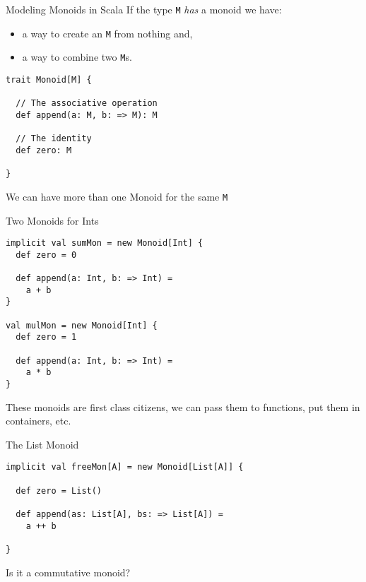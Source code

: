 \documentclass{beamer}
\begin{document}
\begin{framej}
\begin{frame}[fragile]{Modeling Monoids in Scala}
  If the type \texttt{M} \emph{has} a monoid we have:
  \begin{itemize}
    \item a way to create an \texttt{M} from nothing and,
    \item a way to combine two \texttt{M}s.
  \end{itemize}

  \begin{block}{}
  \begin{lstlisting}
trait Monoid[M] {

  // The associative operation
  def append(a: M, b: => M): M

  // The identity
  def zero: M

}
  \end{lstlisting}
  \end{block}

  We can have more than one Monoid for the same \texttt{M}
\end{frame}

\begin{frame}[fragile]{Two Monoids for Ints}
  \begin{block}{}
  \begin{lstlisting}
implicit val sumMon = new Monoid[Int] {
  def zero = 0

  def append(a: Int, b: => Int) =
    a + b
}

val mulMon = new Monoid[Int] {
  def zero = 1

  def append(a: Int, b: => Int) =
    a * b
}
  \end{lstlisting}
  \end{block}
  These monoids are first class citizens, we can pass them to
  functions, put them in containers, etc.
\end{frame}

\begin{frame}[fragile]{The List Monoid}
  \begin{block}{}

  \begin{lstlisting}
implicit val freeMon[A] = new Monoid[List[A]] {

  def zero = List()

  def append(as: List[A], bs: => List[A]) =
    a ++ b

}
  \end{lstlisting}
  \end{block}
Is it a commutative monoid?
\end{frame}


\end{framej}
\end{document}
